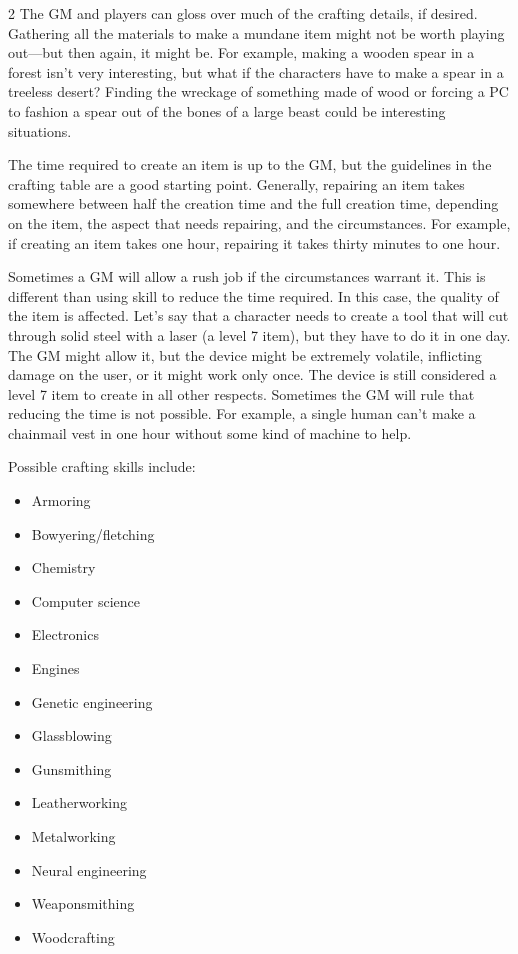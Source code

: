 \begin{multicols}{2}
The GM and players can gloss over much of the crafting details, if desired. Gathering all the materials to make a mundane item might not be worth playing out—but then again, it might be. For example, making a wooden spear in a forest isn’t very interesting, but what if the characters have to make a spear in a treeless desert? Finding the wreckage of something made of wood or forcing a PC to fashion a spear out of the bones of a large beast could be interesting situations.

The time required to create an item is up to the GM, but the guidelines in the crafting table are a good starting point. Generally, repairing an item takes somewhere between half the creation time and the full creation time, depending on the item, the aspect that needs repairing, and the circumstances. For example, if creating an item takes one hour, repairing it takes thirty minutes to one hour.

Sometimes a GM will allow a rush job if the circumstances warrant it. This is different than using skill to reduce the time required. In this case, the quality of the item is affected. Let’s say that a character needs to create a tool that will cut through solid steel with a laser (a level 7 item), but they have to do it in one day. The GM might allow it, but the device might be extremely volatile, inflicting damage on the user, or it might work only once. The device is still considered a level 7 item to create in all other respects. Sometimes the GM will rule that reducing the time is not possible. For example, a single human can’t make a chainmail vest in one hour without some kind of machine to help.

Possible crafting skills include:
\begin{itemize}
\item Armoring
\item Bowyering/fletching
\item Chemistry
\item Computer science
\item Electronics
\item Engines
\item Genetic engineering 
\item Glassblowing
\item Gunsmithing
\item Leatherworking
\item Metalworking
\item Neural engineering
\item Weaponsmithing
\item Woodcrafting
\end{itemize}


\end{multicols}

